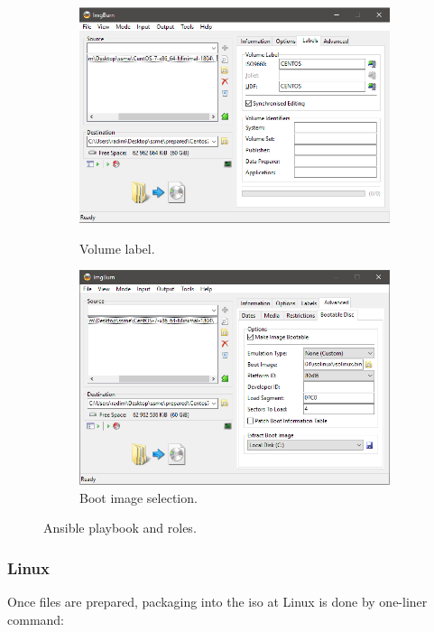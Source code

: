 \documentclass[
  printed, %
  table,   %
  nolof,     %
  nolot,     %
           oneside, color
]{fithesis3}
\renewcommand{\texttt}[1]{%
  \begingroup
  \ttfamily
  \begingroup\lccode`~=`/\lowercase{\endgroup\def~}{/\discretionary{}{}{}}%
  \begingroup\lccode`~=`[\lowercase{\endgroup\def~}{[\discretionary{}{}{}}%
  \begingroup\lccode`~=`.\lowercase{\endgroup\def~}{.\discretionary{}{}{}}%
  \catcode`/=\active\catcode`[=\active\catcode`.=\active
  \scantokens{#1\noexpand}%
  \endgroup
}
\begin{document}
\begin{figure}[H]
\begin{subfigure}{.5\textwidth}
\begin{center}

 \includegraphics[trim={9.1cm 3cm 0.4cm 3cm},clip,width=.8\textwidth]{Screenshot_16.png}
    \caption{Volume label.}
    \label{pic:withoutresdrawable}
 \label{fig:sub1}\end{center}
\end{subfigure}%
\begin{subfigure}{.5\textwidth}
\begin{center}

 \includegraphics[trim={9.1cm 3cm 0.4cm 3cm},clip,width=.8\textwidth]{Screenshot_17.png}
    \caption{Boot image selection.}
\end{center}
\end{subfigure}
\label{fig:test}\caption{Ansible playbook and roles.}
\end{figure}


\subsubsection{Linux}
Once files are prepared, packaging into the iso at Linux is done by one-liner command:
\end{document}
